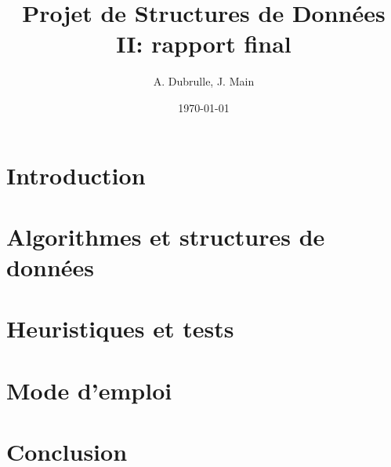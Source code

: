 \documentclass[a4paper, 12pt]{article}
\title{Projet de Structures de Données II: rapport final}
\author{A. Dubrulle, J. Main}
\date{\today}
\theoremstyle{definition} \newtheorem{df}{D\'{e}finition}[section]
\theoremstyle{definition} \newtheorem{ex}[df]{Exemple}
\theoremstyle{definition} \newtheorem{thm}[df]{Th\'{e}or\`{e}me}
\theoremstyle{definition} \newtheorem{cor}[df]{Corollaire}
\theoremstyle{definition} \newtheorem{lem}[df]{Lemme}
\theoremstyle{definition} \newtheorem{obs}[df]{Observation}
\theoremstyle{definition} \newtheorem{prop}[df]{Proposition}
\theoremstyle{definition} \newtheorem{rem}[df]{Remarque}
\begin{document}
\maketitle
\tableofcontents
\section{Introduction}


\section{Algorithmes et structures de données}

\section{Heuristiques et tests}


\section{Mode d'emploi}

\section{Conclusion}


\nocite{*}


\appendix

\end{document}
